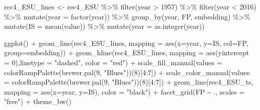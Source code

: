 \documentclass[
]{article}
\newenvironment{Shaded}{\begin{snugshade}}{\end{snugshade}}
\newcommand{\AttributeTok}[1]{\textcolor[rgb]{0.77,0.63,0.00}{#1}}
\newcommand{\DecValTok}[1]{\textcolor[rgb]{0.00,0.00,0.81}{#1}}
\newcommand{\FunctionTok}[1]{\textcolor[rgb]{0.00,0.00,0.00}{#1}}
\newcommand{\NormalTok}[1]{#1}
\newcommand{\OtherTok}[1]{\textcolor[rgb]{0.56,0.35,0.01}{#1}}
\newcommand{\SpecialCharTok}[1]{\textcolor[rgb]{0.00,0.00,0.00}{#1}}
\newcommand{\StringTok}[1]{\textcolor[rgb]{0.31,0.60,0.02}{#1}}
\begin{document}
\begin{Shaded}
\begin{Highlighting}[]
\NormalTok{rec4\_ESU\_lines }\OtherTok{\textless{}{-}}\NormalTok{ rec4\_ESU }\SpecialCharTok{\%\textgreater{}\%} 
  \FunctionTok{filter}\NormalTok{(year }\SpecialCharTok{\textgreater{}} \DecValTok{1957}\NormalTok{) }\SpecialCharTok{\%\textgreater{}\%}
  \FunctionTok{filter}\NormalTok{(year }\SpecialCharTok{\textless{}} \DecValTok{2016}\NormalTok{) }\SpecialCharTok{\%\textgreater{}\%} 
  \FunctionTok{mutate}\NormalTok{(}\AttributeTok{year =} \FunctionTok{factor}\NormalTok{(year)) }\SpecialCharTok{\%\textgreater{}\%} 
  \FunctionTok{group\_by}\NormalTok{(year, FP, embedding) }\SpecialCharTok{\%\textgreater{}\%} 
  \FunctionTok{mutate}\NormalTok{(}\AttributeTok{IS =} \FunctionTok{mean}\NormalTok{(value)) }\SpecialCharTok{\%\textgreater{}\%} 
  \FunctionTok{mutate}\NormalTok{(}\AttributeTok{year =} \FunctionTok{as.integer}\NormalTok{(year))}


\FunctionTok{ggplot}\NormalTok{() }\SpecialCharTok{+}
  \FunctionTok{geom\_line}\NormalTok{(rec4\_ESU\_lines, }\AttributeTok{mapping =} \FunctionTok{aes}\NormalTok{(}\AttributeTok{x=}\NormalTok{year, }\AttributeTok{y=}\NormalTok{IS, }\AttributeTok{col=}\NormalTok{FP, }\AttributeTok{group=}\NormalTok{embedding)) }\SpecialCharTok{+}    
  \FunctionTok{geom\_hline}\NormalTok{(rec4\_ESU\_lines, }\AttributeTok{mapping =} \FunctionTok{aes}\NormalTok{(}\AttributeTok{yintercept =} \DecValTok{0}\NormalTok{),}\AttributeTok{linetype =} \StringTok{"dashed"}\NormalTok{, }\AttributeTok{color =} \StringTok{"red"}\NormalTok{) }\SpecialCharTok{+}
  \FunctionTok{scale\_fill\_manual}\NormalTok{(}\AttributeTok{values =} \FunctionTok{colorRampPalette}\NormalTok{(}\FunctionTok{brewer.pal}\NormalTok{(}\DecValTok{9}\NormalTok{, }\StringTok{"Blues"}\NormalTok{))(}\DecValTok{8}\NormalTok{)[}\DecValTok{4}\SpecialCharTok{:}\DecValTok{7}\NormalTok{]) }\SpecialCharTok{+}
  \FunctionTok{scale\_color\_manual}\NormalTok{(}\AttributeTok{values =} \FunctionTok{colorRampPalette}\NormalTok{(}\FunctionTok{brewer.pal}\NormalTok{(}\DecValTok{9}\NormalTok{, }\StringTok{"Blues"}\NormalTok{))(}\DecValTok{8}\NormalTok{)[}\DecValTok{4}\SpecialCharTok{:}\DecValTok{7}\NormalTok{]) }\SpecialCharTok{+}
  \FunctionTok{geom\_line}\NormalTok{(rec4\_ESU\_ts, }\AttributeTok{mapping =} \FunctionTok{aes}\NormalTok{(}\AttributeTok{x=}\NormalTok{year, }\AttributeTok{y=}\NormalTok{IS), }\AttributeTok{color =} \StringTok{"black"}\NormalTok{) }\SpecialCharTok{+}
  \FunctionTok{facet\_grid}\NormalTok{(FP }\SpecialCharTok{\textasciitilde{}}\NormalTok{ ., }\AttributeTok{scales =} \StringTok{"free"}\NormalTok{) }\SpecialCharTok{+}
  \FunctionTok{theme\_bw}\NormalTok{()}
\end{Highlighting}
\end{Shaded}
\end{document}
